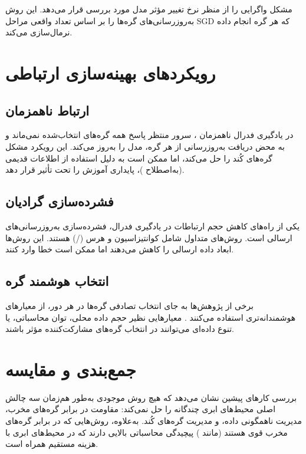  \cite{wang2020tackling} مشکل واگرایی را از منظر نرخ تغییر مؤثر مدل مورد بررسی قرار می‌دهد. این روش به‌روزرسانی‌های گره‌ها را بر اساس تعداد واقعی مراحل \gls{SGD} که هر گره انجام داده نرمال‌سازی می‌کند.


\section{رویکردهای بهینه‌سازی ارتباطی}
\label{sec:rw_comm}

\subsection{ارتباط ناهمزمان}

در یادگیری فدرال ناهمزمان \cite{xie2019asynchronous}، سرور منتظر پاسخ همه گره‌های انتخاب‌شده نمی‌ماند و به محض دریافت به‌روزرسانی از هر گره، مدل را به‌روز می‌کند. این رویکرد مشکل گره‌های کُند را حل می‌کند، اما ممکن است به دلیل استفاده از اطلاعات قدیمی (به‌اصطلاح )، پایداری آموزش را تحت تأثیر قرار دهد.

\subsection{فشرده‌سازی گرادیان}

یکی از راه‌های کاهش حجم ارتباطات در یادگیری فدرال، فشرده‌سازی به‌روزرسانی‌های ارسالی است. روش‌های متداول شامل کوانتیزاسیون \cite{reisizadeh2020fedpaq} و هرس (/) \cite{lin2017deep} هستند. این روش‌ها ابعاد داده ارسالی را کاهش می‌دهند اما ممکن است خطا وارد کنند.

\subsection{انتخاب هوشمند گره}

برخی از پژوهش‌ها به جای انتخاب تصادفی گره‌ها در هر دور، از معیارهای هوشمندانه‌تری استفاده می‌کنند \cite{lai2021oort}. معیارهایی نظیر حجم داده محلی، توان محاسباتی، یا تنوع داده‌ای می‌توانند در انتخاب گره‌های مشارکت‌کننده مؤثر باشند.


\section{جمع‌بندی و مقایسه}
\label{sec:rw_summary}

بررسی کارهای پیشین نشان می‌دهد که هیچ روش موجودی به‌طور هم‌زمان سه چالش اصلی محیط‌های ابری چندگانه را حل نمی‌کند: مقاومت در برابر گره‌های مخرب، مدیریت ناهمگونی داده، و مدیریت گره‌های کُند. به‌علاوه، روش‌هایی که در برابر گره‌های مخرب قوی هستند (مانند ) پیچیدگی محاسباتی بالایی دارند که در محیط‌های ابری با هزینه مستقیم همراه است.


